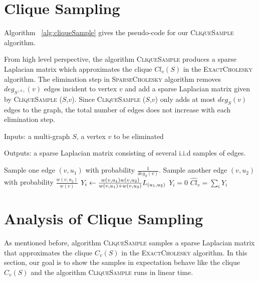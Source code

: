 \documentclass[11pt]{article}
\newcommand{\csamp}{\textsc{CliqueSample }}
\newcommand{\sparsecholesky}{\textsc{SparseCholesky }}
\newcommand{\exactcholesky}{\textsc{ExactCholesky }}
\begin{document}
\section{Clique Sampling}

Algorithm ~\ref{alg:cliqueSample} gives the pseudo-code for our \csamp algorithm.

From high level perspective, the algorithm \csamp produces a sparse Laplacian matrix which approximates the clique $Cl_v(S)$ 
in the \exactcholesky algorithm. The elimination step in \sparsecholesky algorithm removes $deg_{S^{(k)}}(v)$ edges incident to vertex 
$v$ and add a sparse Laplacian matrix given by \csamp($S$,$v$). Since \csamp($S$,$v$) only adds at most $deg_S(v)$ edges 
to the graph, the total number of edges does not increase with each elimination step. 

\begin{algorithm}
	\caption{\csamp($S$,$v$)}
    \label{alg:cliqueSample}
    Inputs: a multi-graph $S$, a vertex $v$ to be eliminated
  
    Outputs: a sparse Laplacian matrix consisting of several i.i.d samples of edges.  
    
	\begin{algorithmic}[1]
            \State Sample one edge $(v, u_1)$ with probability $ \frac1{deg_S(v)} $.
			\State Sample another edge $(v,u_2)$ with probability $ \frac{w(v,u_2)}{w(v)} $ 
				\State $ Y_{i} \gets \frac{w\paren{v,u_1}w\paren{v,u_2}}{w\paren{v,u_1} + w\paren{v,u_2}}L_{\paren{u_1,u_2}} $
			\Else
                \State $ Y_i = 0 $
            \EndIf
		\EndFor
        \State \Return $ \widehat{Cl}_v = \sum_{i}Y_{i} $
	\end{algorithmic}
\end{algorithm}


\section{Analysis of Clique Sampling}

As mentioned before, algorithm \csamp samples a sparse Laplacian matrix that approximates the clique $C_v(S)$ in the \exactcholesky algorithm. In this section, our goal is to show the samples in expectation behave like the clique $C_v(S)$ and the algorithm \csamp runs in linear time.  
\end{document}
